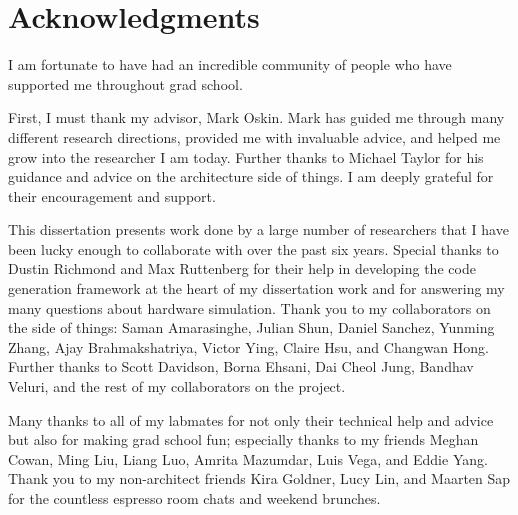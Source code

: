 
\bigskip

\begingroup
\let\clearpage\relax
\let\cleardoublepage\relax
\let\cleardoublepage\relax
\chapter*{Acknowledgments}

\setlength{\parskip}{5pt}%


I am fortunate to have had an incredible community of people who have supported me throughout grad school. %

First, I must thank my advisor, Mark Oskin.
Mark has guided me through many different research directions, provided me with invaluable advice, and helped me grow into the researcher I am today.
Further thanks to Michael Taylor for his guidance and advice on the architecture side of things.
I am deeply grateful for their encouragement and support.

This dissertation presents work done by a large number of researchers that I have been lucky enough to collaborate with over the past six years.
Special thanks to Dustin Richmond and Max Ruttenberg for their help in developing the code generation framework at the heart of my dissertation work and for answering my many questions about hardware simulation.
Thank you to my collaborators on the \graphit side of things: Saman Amarasinghe, Julian Shun, Daniel Sanchez, Yunming Zhang, Ajay Brahmakshatriya, Victor Ying, Claire Hsu, and Changwan Hong.
Further thanks to Scott Davidson, Borna Ehsani, Dai Cheol Jung, Bandhav Veluri, and the rest of my collaborators on the \hb project. 

Many thanks to all of my labmates for not only their technical help and advice but also for making grad school fun; 
especially thanks to my friends Meghan Cowan, Ming Liu, Liang Luo, Amrita Mazumdar, Luis Vega, and Eddie Yang.
Thank you to my non-architect friends Kira Goldner, Lucy Lin, and Maarten Sap for the countless espresso room chats and weekend brunches.

